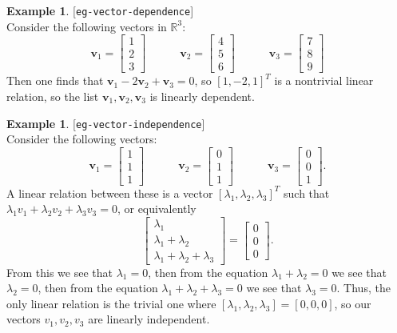 \documentclass{amsart}
\newcommand{\lbl}[1]{\label{#1}\textup{[\texttt{#1}]}\ \\}
\newcommand{\lbl}{\label}
\newcommand{\R}         {{\mathbb{R}}}
\newcommand{\bsm}       {\left[\begin{smallmatrix}}
\newcommand{\esm}       {\end{smallmatrix}\right]}
\newcommand{\lm}        {\lambda}
\newcommand{\vv}        {\mathbf{v}}
\renewcommand{\:}       {\colon}
\theoremstyle{definition}
\newtheorem{example}[theorem]{Example}
\begin{document}
\begin{example}\lbl{eg-vector-dependence}
 Consider the following vectors in $\R^3$:
 \[ \vv_1=\bsm 1\\2\\3\esm \hspace{3em}
    \vv_2=\bsm 4\\5\\6\esm \hspace{3em}
    \vv_3=\bsm 7\\8\\9\esm 
 \]
 Then one finds that $\vv_1-2\vv_2+\vv_3=0$, so $[1,-2,1]^T$
 is a nontrivial linear relation, so the list
 $\vv_1,\vv_2,\vv_3$ is linearly dependent.
\end{example}

\begin{example}\lbl{eg-vector-independence}
 Consider the following vectors:
 \[  \vv_1=\bsm 1\\1\\1 \esm \hspace{3em}
     \vv_2=\bsm 0\\1\\1 \esm \hspace{3em}
     \vv_3=\bsm 0\\0\\1 \esm.
 \]
 A linear relation between these is a vector
 $[\lm_1,\lm_2,\lm_3]^T$ such that
 $\lm_1v_1+\lm_2v_2+\lm_3v_3=0$, or equivalently
 \[ \bsm \lm_1\\ \lm_1+\lm_2 \\ \lm_1+\lm_2+\lm_3 \esm =
    \bsm 0\\ 0\\ 0 \esm.
 \]
 From this we see that $\lm_1=0$, then from the equation
 $\lm_1+\lm_2=0$ we see that $\lm_2=0$, then from the
 equation $\lm_1+\lm_2+\lm_3=0$ we see that $\lm_3=0$.
 Thus, the only linear relation is the trivial one where
 $[\lm_1,\lm_2,\lm_3]=[0,0,0]$, so our vectors $v_1,v_2,v_3$
 are linearly independent.
\end{example}
\end{document}
